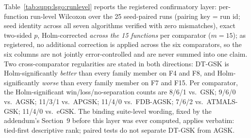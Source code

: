 \documentclass[algorithms,article,submit,moreauthors,pdftex]{Definitions/mdpi}
\newcommand{\dtgsk}{DT-GSK}
\newcommand{\agsk}{AGSK}
\begin{document}
Table~\ref{tab:supp:lsgo:runlevel} reports the registered confirmatory
layer: per-function run-level Wilcoxon over the 25 seed-paired runs
(pairing key = run id; seed identity across all seven algorithms verified
with zero mismatches), exact two-sided $p$, Holm-corrected \emph{across
the 15 functions} per comparator ($m = 15$); as registered, no additional
correction is applied across the six comparators, so the six columns are
not jointly error-controlled and are never summed into one claim.  Two
cross-comparator regularities are stated in both directions: \dtgsk{} is
Holm-significantly \emph{better} than every family member on F4 and F8,
and Holm-significantly \emph{worse} than every family member on F7 and
F15.  Per comparator, the Holm-significant win/loss/no-separation counts
are 8/6/1 vs.\ GSK; 9/6/0 vs.\ AGSK; 11/3/1 vs.\ APGSK; 11/4/0 vs.\ FDB-AGSK; 7/6/2 vs.\ ATMALS-GSK; 11/4/0 vs.\ eGSK.
The binding suite-level wording, fixed by the addendum's Section~9 before
this layer was ever computed, applies verbatim: tied-first descriptive
rank; paired tests do not separate \dtgsk{} from \agsk{}.
\end{document}
